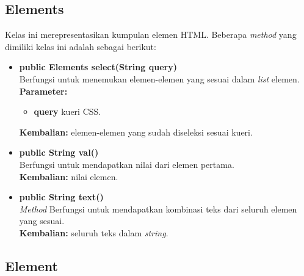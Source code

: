 \subsection{Elements}

Kelas ini merepresentasikan kumpulan elemen HTML. Beberapa \textit{method} yang dimiliki kelas ini adalah sebagai berikut:
\begin{itemize}
	\item \textbf{public Elements select(String query)} \\
		Berfungsi untuk menemukan elemen-elemen yang sesuai dalam \textit{list} elemen. \\
		\textbf{Parameter:} 
		\begin{itemize}
			\item \textbf{query} kueri CSS.
		\end{itemize}
		\textbf{Kembalian:} elemen-elemen yang sudah diseleksi sesuai kueri.	
		
		\item \textbf{public String val()} \\
		Berfungsi untuk mendapatkan nilai dari elemen pertama. \\
		\textbf{Kembalian:} nilai elemen.	
		
		\item \textbf{public String text()} \\
		\textit{Method} Berfungsi untuk mendapatkan kombinasi teks dari seluruh elemen yang sesuai. \\
		\textbf{Kembalian:} seluruh teks dalam \textit{string}.	
\end{itemize}

\subsection{Element}

